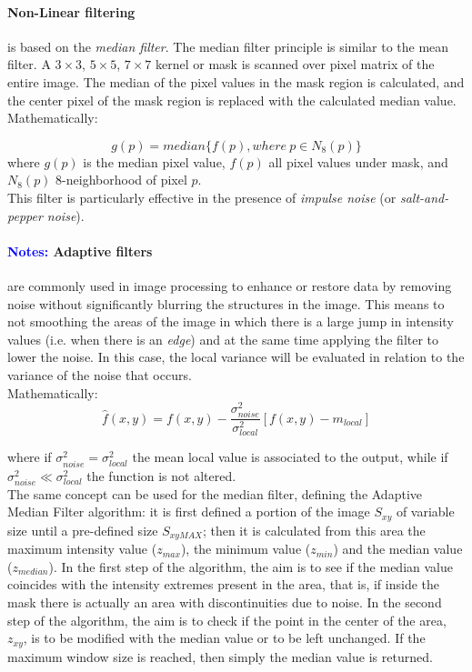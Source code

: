 \documentclass{standalone}
\begin{document}
\paragraph{Non-Linear filtering} is based on the \textit{median filter}\cite{filters}.
The median filter principle is similar to the mean filter. 
A $3\times3$, $5\times5$, $7\times7$ kernel or mask is scanned over pixel matrix of the entire image.
The median of the pixel values in the mask region is calculated, and the center pixel of the mask region is replaced with the calculated median value\cite{filters}.
Mathematically:

\begin{equation}
    g(p) = median\{f(p), where \: p \in N_8(p)\}
\end{equation}
where $g(p)$ is the median pixel value, $f(p)$ all pixel values under mask, and $N_8(p)$ 8-neighborhood of pixel $p$.\\
This filter is particularly effective in the presence of \textit{impulse noise} (or \textit{salt-and-pepper noise})\cite{corrandconv}.

\paragraph{\textcolor{blue}{Notes:} Adaptive filters} 
are commonly used in image processing to enhance or restore data by removing noise without significantly blurring the structures in the image\cite{Adaptive}.
This means to not smoothing the areas of the image in which there is a large jump in intensity values (i.e. when there is an \textit{edge}) and at the same time applying the filter to lower the noise.
In this case, the local variance will be evaluated in relation to the variance of the noise that occurs.\\
Mathematically:
\begin{equation}
    \hat{f}(x, y) = f(x, y) - \frac{\sigma_{noise}^2}{\sigma_{local}^2}[f(x, y) - m_{local}]
\end{equation}

where if  $\sigma_{noise}^2 = \sigma_{local}^2$ the mean local value is associated to the output, while if $\sigma_{noise}^2 \ll \sigma_{local}^2$ the function is not altered.
\\
The same concept can be used for the median filter, defining the Adaptive Median Filter
algorithm:
it is first defined a portion of the image $S_{xy}$ of variable size until a pre-defined size $S_{xy MAX}$;
then it is calculated from this area the maximum intensity value ($z_{max}$), the minimum value ($z_{min}$) and the median value ($z_{median}$).
In the first step of the algorithm, the aim is to see if the median value coincides with the intensity extremes present in the area, that is, if inside the mask there is actually an area with discontinuities due to noise.
In the second step of the algorithm, the aim is to check if the point in the center of the area, $z_{xy}$, is to be modified with the median value or to be left unchanged. 
If the maximum window size is reached, then simply the median value is returned.
\end{document}
